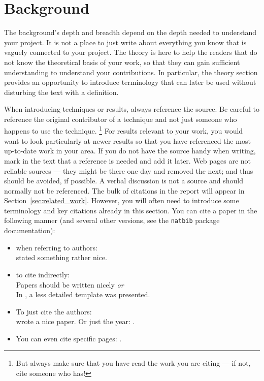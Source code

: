 \section{Background}
\label{sec:background}

The background's depth and breadth depend on the depth needed to understand your project.
It is not a place to just write about everything you know that is vaguely connected to your project. 
The theory is here to help the readers that do not know the theoretical basis of your work, so that they 
can gain sufficient understanding to understand your contributions. In particular, the theory section provides 
an opportunity to introduce terminology that can later be used without disturbing the text with a definition.  

When introducing techniques or results, always reference the source. 
Be careful to reference the original contributor of a technique and not just someone who happens to use the technique.%
\footnote{But always make sure that you have read the work you are citing --- if not, cite someone who has!}
For results relevant to your work, 
you would want to look particularly at newer results so that you have referenced the most up-to-date work in your area. 
If you do not have the source handy when writing, mark in the text that a reference is needed and add it later.  
Web pages are not reliable sources --- they might be there one day and removed the next; and thus should be avoided, if possible. 
A verbal discussion is not a source and should normally not be referenced.  
The bulk of citations in the report will appear in Section~\ref{sec:related_work}. 
However, you will often need to introduce some terminology and key citations already in this section. 
%
You can cite a paper in the following manner (and several other versions, 
see the \verb!natbib! package documentation):

\begin{itemize}
\item when referring to authors:\\
 \citet{Authorson;Bobsen:10} stated something rather nice.
\item to cite indirectly: \\
 Papers should be written nicely \citep{Authorson;Bobsen:10}
{\em or\/}\\
In \cite{Authorson;Bobsen:10}, a less detailed template was presented.
\item To just cite the authors: \\
\citeauthor{Authorson;Bobsen:10} wrote a nice paper.
Or just the year: \citeyear{Authorson;Bobsen:10}.
\item You can even cite specific pages: \citet[p. 3]{Authorson;Bobsen:10}.
\end{itemize}

